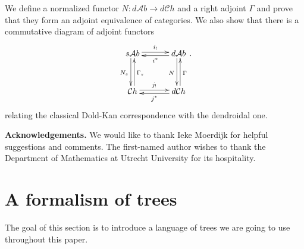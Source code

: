 \documentclass[a4paper]{amsart}
\theoremstyle{plain}
\theoremstyle{definition}
\theoremstyle{remark}
\newcommand{\A}{\mathcal{A}b}
\newcommand{\Ch}{\mathcal{C}h}
\newcommand{\dCh}{d\mathcal{C}h}
\newcommand{\dAb}{d\mathcal{A}b}
\numberwithin{equation}{section}
\numberwithin{figure}{section}
\begin{document}
We define a normalized functor $N\colon d\A\longrightarrow d\Ch$ and a right adjoint $\Gamma$ and prove that they form an adjoint equivalence of
categories. We also show that there is a commutative diagram of adjoint functors
$$
    \xymatrix@R+3mm@C+3mm{ s\A\ar@<2pt>[r]^-{i_!}\ar@<-2pt>[d]_{N_s} &\dAb\ar@<-2pt>[d]_N\ar@<2pt>[l]^-{i^*} \\
    \Ch\ar@<2pt>[r]^-{j_!}\ar@<-2pt>[u]_{\Gamma_s}&\dCh\ar@<2pt>[l]^-{j^*}\ar@<-2pt>[u]_{\Gamma}}.
$$
relating the classical Dold-Kan correspondence with the dendroidal one.

\bigskip
\noindent\textbf{Acknowledgements.} We would like to thank Ieke
Moerdijk for helpful suggestions and comments. The first-named
author wishes to thank the Department of Mathematics at Utrecht
University for its hospitality.
\section{A formalism of trees}
The goal of this section is to introduce a language of trees we are
going to use throughout this paper.
\end{document}
